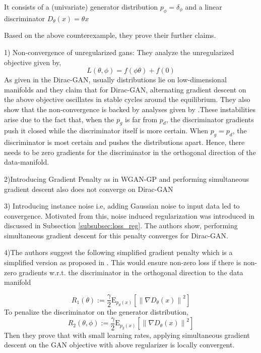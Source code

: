 \begin{definition}
It consists of a (univariate) generator distribution $p_\phi = \delta_\phi$ and a linear discriminator $D_{\theta} (x)  = \theta x$

Based on the above counterexample, they prove their further claims.

\end{definition}{}

1) Non-convergence of unregularized gans:
They analyze the unregularized objective given by,
$$
L(\theta, \phi)=f(\phi \theta)+f(0)
$$
As given in the Dirac-GAN, usually distributions lie on low-dimensional manifolds and they claim that for Dirac-GAN, alternating gradient descent on the above objective oscillates in stable cycles around the equilibrium. They also show that the non-convergence is backed by analyses given by \citep{geiger06,CMU17}.These instabilities arise due to the fact that, when the $p_g$ is far from $p_d$, the discriminator gradients push it closed while the discriminator itself is more certain. When $p_g = p_d$, the discriminator is most certain and pushes the distributions apart. Hence, there needs to be zero gradients for the discriminator in the orthogonal direction of the data-manifold.

2)Introducing Gradient Penalty as in \citep{gularajani} WGAN-GP and performing simultaneous gradient descent also does not converge on Dirac-GAN

3) Introducing instance noise i.e, adding Gaussian noise to input data led to convergence. Motivated from this, noise induced regularization was introduced in \citep{fgan_2} discussed in Subsection \ref{subsubsec:loss_reg}. The authors show, performing simultaneous gradient descent for this penalty converges for Dirac-GAN.

4)The authors suggest the following simplified gradient
penalty which is a simplified version as proposed in \citep{fgan_2}. This would ensure non-zero loss if there is non-zero gradients w.r.t. the discriminator in the orthogonal direction to the data manifold 

\begin{equation}
    R_{1}(\theta) :=\frac{\gamma}{2} \mathrm{E}_{p_d (x)}\left[\left\|\nabla D_{\theta}(x)\right\|^{2}\right]
\end{equation}{}
 To penalize the discriminator on the generator distribution,
 \begin{equation}
R_{2}(\theta, \phi) :=\frac{\gamma}{2} \mathrm{E}_{p_g(x)}\left[\left\|\nabla D_{\theta}(x)\right\|^{2}\right]
\end{equation}  
Then they prove that with small learning rates, applying simultaneous gradient descent on the GAN objective with above regularizer is locally convergent.




